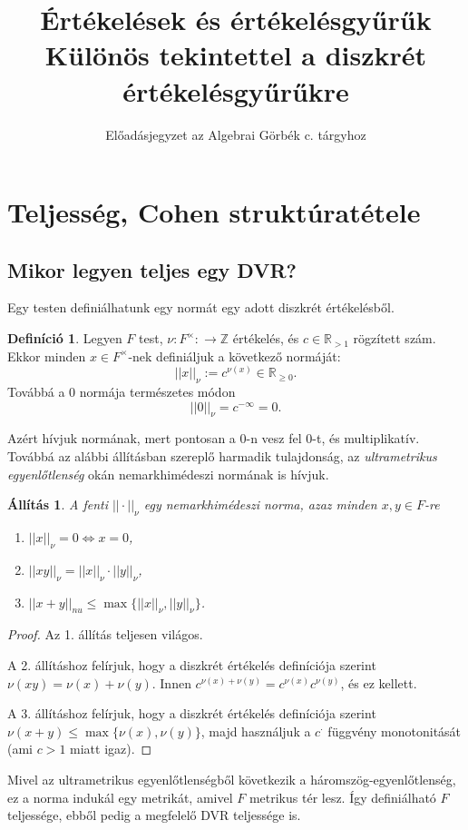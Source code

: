 \documentclass[11pt,a4paper]{article}
\title{Értékelések és értékelésgyűrűk\\
\large Különös tekintettel a diszkrét értékelésgyűrűkre}
\author{Előadásjegyzet az Algebrai Görbék c. tárgyhoz}
\date{}
\newtheorem{allitas}[tetel]{Állítás}
\theoremstyle{definition}
\newtheorem{definicio}[tetel]{Definíció}
\begin{document}
\section{Teljesség, Cohen struktúratétele}

\subsection{Mikor legyen teljes egy DVR?}

Egy testen definiálhatunk egy normát egy adott diszkrét értékelésből.

\begin{definicio}
Legyen $F$ test, $\nu: F^{\times}:\rightarrow\mathbb{Z}$ értékelés, és $c\in\mathbb{R}_{>1}$ rögzített szám. Ekkor minden $x\in F^{\times}$-nek definiáljuk a következő normáját:
$$||x||_{\nu}:=c^{\nu(x)}\in\mathbb{R}_{\ge0}.$$
Továbbá a $0$ normája természetes módon
$$||0||_{\nu}=c^{-\infty}=0.$$
\end{definicio}

Azért hívjuk normának, mert pontosan a $0$-n vesz fel $0$-t, és multiplikatív. Továbbá az alábbi állításban szereplő harmadik tulajdonság, az {\it ultrametrikus egyenlőtlenség} okán nemarkhimédeszi normának is hívjuk.

\begin{allitas}
A fenti $||\cdot ||_{\nu}$ egy {\it nemarkhimédeszi norma}, azaz minden $x,y\in F$-re
\begin{enumerate}
\item $||x||_{\nu}=0\Leftrightarrow x=0$,
\item $||xy||_{\nu}=||x||_{\nu}\cdot ||y||_{\nu}$,
\item $||x+y||_{nu}\le\max\{||x||_{\nu},||y||_{\nu}\}$.
\end{enumerate}
\end{allitas}
\begin{proof}
Az 1. állítás teljesen világos.

A 2. állításhoz felírjuk, hogy a diszkrét értékelés definíciója szerint $\nu(xy)=\nu(x)+\nu(y)$. Innen $c^{\nu(x)+\nu(y)}=c^{\nu(x)}c^{\nu(y)}$, és ez kellett.

A 3. állításhoz felírjuk, hogy a diszkrét értékelés definíciója szerint $\nu(x+y)\le\max\{\nu(x),\nu(y)\}$, majd használjuk a $c^{\cdot}$ függvény monotonitását (ami $c>1$ miatt igaz).
\end{proof}

Mivel az ultrametrikus egyenlőtlenségből következik a háromszög-egyenlőtlenség, ez a norma indukál egy metrikát, amivel $F$ metrikus tér lesz. Így definiálható $F$ teljessége, ebből pedig a megfelelő DVR teljessége is.
\end{document}
